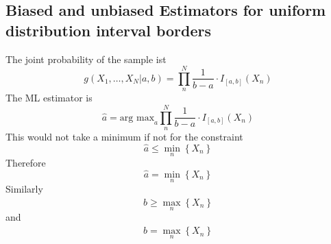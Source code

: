 \subsection{Biased and unbiased Estimators for uniform distribution interval borders}
The joint probability of the sample ist
\begin{equation}
    g\left(X_1,\dots,X_N\vert a,b\right)=\prod_n^N \frac{1}{b-a}\cdot I_{\left[a,b\right]}\left(X_n\right)
\end{equation}
The ML estimator is
\begin{equation}
    \hat{a}=\text{arg max}_a\prod_{n}^{N}\frac{1}{b-a}\cdot I_{\left[a,b\right]}\left(X_n\right)
\end{equation}
This would not take a minimum if not for the constraint
\begin{equation}
    \hat{a}\leq\min_n\left\{X_n\right\}
\end{equation}
Therefore
\begin{equation}
    \hat{a}=\min_n\left\{X_n\right\}
\end{equation}
Similarly
\begin{equation}
    \hat{b}\geq\max_n\left\{X_n\right\}
\end{equation}
and
\begin{equation}
    \hat{b}=\max_n\left\{X_n\right\}
\end{equation}
